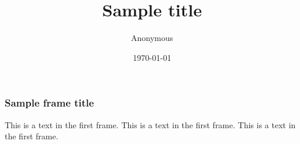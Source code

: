 \documentclass{beamer}
\title{Sample title}
\author{Anonymous}
\institute{Overleaf}
\date{\today}
\begin{document}
	\frame{\titlepage}

	\begin{frame}
		\frametitle{Sample frame title}
		This is a text in the first frame. This is a text in the first frame. This is a text in the first frame.
	\end{frame}
\end{document}
